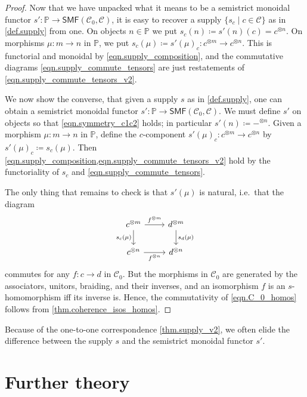 \documentclass[11pt, oneside, article]{memoir}
\theoremstyle{plain}
\theoremstyle{definition}
\theoremstyle{remark}
\newcommand{\cat}[1]{\mathcal{#1}}%
\newcommand{\Cat}[1]{{\mathsf{#1}}}%
\newcommand{\tpow}[1]{^{\otimes #1}}
\newcommand{\smf}{\Cat{SMF}}
\newcommand{\pp}{\mathbb{P}}
\newcommand{\mob}[1]{#1_0}
\begin{document}
\begin{proof}
Now that we have unpacked what it means to be a semistrict monoidal functor $s'\colon\pp\to\smf(\mob{\cat{C}},\cat{C})$, it is easy to recover a supply $\{s_c\mid c\in\cat{C}\}$ as in \cref{def.supply} from one. On objects $n\in\pp$ we put $s_c(n)\coloneqq s'(n)(c)=c\tpow{n}$. On morphisms $\mu\colon m\to n$ in $\pp$, we put $s_c(\mu)\coloneqq s'(\mu)_c\colon c\tpow{m}\to c\tpow{n}$. This is functorial and monoidal by \cref{eqn.supply_composition}, and the commutative diagrams \eqref{eqn.supply_commute_tensors} are just restatements of \eqref{eqn.supply_commute_tensors_v2}.

We now show the converse, that given a supply $s$ as in \cref{def.supply}, one can obtain a semistrict monoidal functor $s'\colon\pp\to\smf(\mob{\cat{C}},\cat{C})$. We must define $s'$ on objects so that \cref{eqn.symmetry_c1c2} holds; in particular $s'(n)\coloneqq -\tpow{n}$. Given a morphism $\mu\colon m\to n$ in $\pp$, define the $c$-component $s'(\mu)_c\colon c\tpow{m}\to c\tpow{n}$ by $s'(\mu)_c\coloneqq s_c(\mu)$. Then \cref{eqn.supply_composition,eqn.supply_commute_tensors_v2} hold by the functoriality of $s_c$ and \cref{eqn.supply_commute_tensors}.
 
 The only thing that remains to check is that $s'(\mu)$ is natural, i.e.\ that the diagram
 \begin{equation}\label{eqn.C_0_homos}
 \begin{tikzcd}
	c\tpow{m}\ar[d, "s_c(\mu)"']\ar[r, "f\tpow{m}"]&
	d\tpow{m}\ar[d, "s_d(\mu)"]\\
	c\tpow{n}\ar[r, "f\tpow{n}"']&
	d\tpow{n}
\end{tikzcd}
\end{equation}
commutes for any $f\colon c\to d$ in $\mob{\cat{C}}$. But the morphisms in $\mob{\cat{C}}$ are generated by the associators, unitors, braiding, and their inverses, and an isomorphism $f$ is an $s$-homomorphism iff its inverse is. Hence, the commutativity of \cref{eqn.C_0_homos} follows from \cref{thm.coherence_isos_homos}.
\end{proof}

Because of the one-to-one correspondence \cref{thm.supply_v2}, we often elide the difference between the supply $s$ and the semistrict monoidal functor $s'$. 

\section{Further theory}\label{sec.further_theory}
\end{document}
